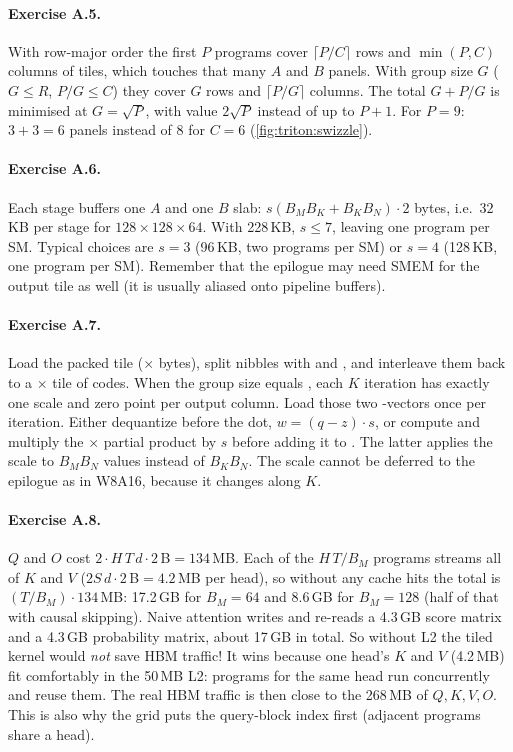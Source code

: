\paragraph{Exercise A.5.} With row-major order the first $P$ programs cover
$\lceil P/C\rceil$ rows and $\min(P,C)$ columns of tiles, which touches that many $A$ and
$B$ panels. With group size $G$ ($G\le R$, $P/G\le C$) they cover $G$ rows and
$\lceil P/G\rceil$ columns. The total $G+P/G$ is minimised at $G=\sqrt P$, with value
$2\sqrt P$ instead of up to $P+1$. For $P=9$: $3+3=6$ panels instead of 8 for
$C=6$ (\cref{fig:triton:swizzle}).

\paragraph{Exercise A.6.} Each stage buffers one $A$ and one $B$ slab:
$s(B_MB_K+B_KB_N)\cdot2$ bytes, i.e.\ $32$\,KB per stage for $128\times128\times64$.
With 228\,KB, $s\le7$, leaving one program per SM. Typical choices are $s=3$ (96\,KB,
two programs per SM) or $s=4$ (128\,KB, one program per SM). Remember that the
epilogue may need SMEM for the output tile as well (it is usually aliased onto
pipeline buffers).

\paragraph{Exercise A.7.} Load the packed tile ($\times$ bytes),
split nibbles with  and , and interleave them back to a
$\times$ tile of codes. When the group size equals , each $K$
iteration has exactly one scale and zero point per output column. Load those two
-vectors once per iteration. Either dequantize before the dot,
$w=(q-z)\cdot s$, or compute  and multiply the
$\times$ partial product by $s$ before adding it to . The
latter applies the scale to $B_MB_N$ values instead of $B_KB_N$. The scale cannot be
deferred to the epilogue as in W8A16, because it changes along $K$.

\paragraph{Exercise A.8.} $Q$ and $O$ cost $2\cdot H\,T\,d\cdot2$\,B$=134$\,MB. Each of
the $H\,T/B_M$ programs streams all of $K$ and $V$ ($2S\,d\cdot2$\,B$=4.2$\,MB per head),
so without any cache hits the total is $(T/B_M)\cdot134$\,MB: 17.2\,GB for $B_M=64$ and
8.6\,GB for $B_M=128$ (half of that with causal skipping). Naive attention writes and
re-reads a 4.3\,GB score matrix and a 4.3\,GB probability matrix, about 17\,GB in total.
So without L2 the tiled kernel would \emph{not} save HBM traffic! It wins because one
head's $K$ and $V$ (4.2\,MB) fit comfortably in the 50\,MB L2: programs for the same head
run concurrently and reuse them. The real HBM traffic is then close to the 268\,MB of
$Q,K,V,O$. This is also why the grid puts the query-block index first (adjacent
programs share a head).

